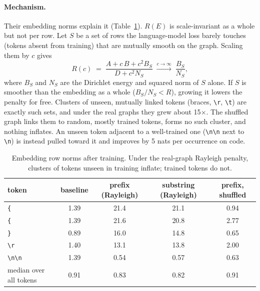 \documentclass[11pt]{article}
\newcommand{\tok}[1]{\texttt{#1}}          %
\newcommand{\vsp}{\textvisiblespace}          %
\begin{document}
\paragraph{Mechanism.} Their embedding norms explain it (Table~\ref{tab:norms}).
$R(E)$ is scale-invariant as a whole but not per row. Let $S$ be a set of rows the
language-model loss barely touches (tokens absent from training) that are mutually
smooth on the graph. Scaling them by $c$ gives
\begin{equation}
  R(c) \;=\; \frac{A + c\,B + c^2 B_S}{D + c^2 N_S}
  \;\xrightarrow{c\to\infty}\; \frac{B_S}{N_S},
\end{equation}
where $B_S$ and $N_S$ are the Dirichlet energy and squared norm of $S$ alone. If $S$
is smoother than the embedding as a whole ($B_S/N_S<R$), growing it lowers the
penalty for free. Clusters of unseen, mutually linked tokens (braces, \tok{\textbackslash r},
\tok{\textbackslash t}) are exactly such sets, and under the real graphs they grew about
15$\times$. The shuffled graph links them to random, mostly trained tokens, forms no
such cluster, and nothing inflates. An unseen token adjacent to a well-trained one
(\tok{\textbackslash n\textbackslash n} next to \tok{\textbackslash n}) is instead pulled
toward it and improves by 5 nats per occurrence on code.

\begin{table}[t]
\centering
\small
\begin{tabular}{lcccc}
\toprule
token & baseline & prefix (Rayleigh) & substring (Rayleigh) & prefix, shuffled \\
\midrule
\tok{\{}                        & 1.39 & 21.4 & 21.1 & 0.94 \\
\tok{\vsp\{}                     & 1.39 & 21.6 & 20.8 & 2.77 \\
\tok{\}}                        & 0.89 & 16.0 & 14.8 & 0.65 \\
\tok{\textbackslash r}          & 1.40 & 13.1 & 13.8 & 2.00 \\
\tok{\textbackslash n\textbackslash n} & 1.39 & 0.54 & 0.57 & 0.63 \\
median over all tokens          & 0.91 & 0.83 & 0.82 & 0.91 \\
\bottomrule
\end{tabular}
\caption{Embedding row norms after training. Under the real-graph Rayleigh penalty,
clusters of tokens unseen in training inflate; trained tokens do not.}
\label{tab:norms}
\end{table}
\end{document}
